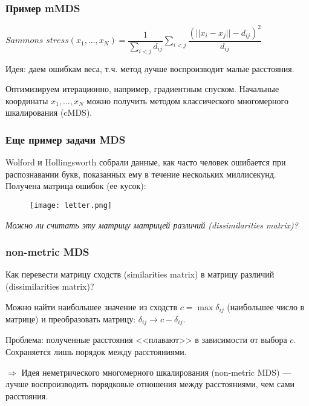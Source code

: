 \documentclass[10pt]{beamer}
\begin{document}
\begin{frame}
\frametitle{Пример mMDS}

$Sammons$ $stress(x_1, ..., x_N) = \dfrac{1}{\sum_{i < j} d_{ij}} \sum\limits_{i < j} \dfrac{(||x_i - x_j|| - d_{ij})^2}{d_{ij}}$

\vspace{\baselineskip}
Идея: даем ошибкам веса, т.ч. метод лучше воспроизводит малые расстояния.

\vspace{\baselineskip}
Оптимизируем итерационно, например, градиентным спуском. Начальные координаты $x_1, ..., x_N$ можно получить методом классического многомерного шкалирования (cMDS).
\end{frame}


\begin{frame}
\frametitle{Еще пример задачи MDS}

Wolford и Hollingsworth собрали данные, как часто человек ошибается при распознавании букв, показанных ему в течение нескольких миллисекунд. Получена матрица ошибок (ее кусок):

\begin{figure}
\centering
        \texttt{[image: letter.png]}
\end{figure}

\textit{Можно ли считать эту матрицу матрицей различий (dissimilarities matrix)?}

\end{frame}

\begin{frame}
\frametitle{non-metric MDS}

Как перевести матрицу сходств (similarities matrix) в матрицу различий (dissimilarities matrix)?

\vspace{\baselineskip}
Можно найти наибольшее значение из сходств  $c = \max\delta_{ij}$ (наибольшее число в матрице) и преобразовать матрицу: $\delta_{ij} \rightarrow c - \delta_{ij}$.

\vspace{\baselineskip}
Проблема: полученные расстояния <<плавают>> в зависимости от выбора $c$. Сохраняется лишь порядок между расстояниями. 

\vspace{\baselineskip}
$\Rightarrow$ Идея неметрического многомерного шкалирования (non-metric MDS) --- лучше воспроизводить порядковые отношения между расстояниями, чем сами расстояния.


\end{frame}
\end{document}
